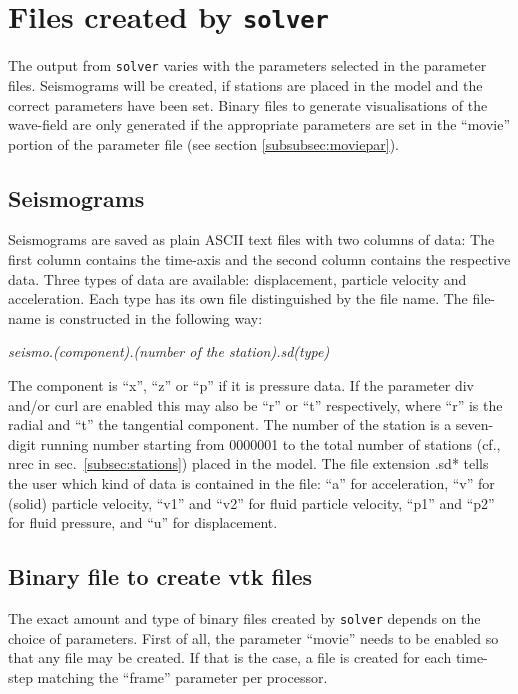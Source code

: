 	\section{Files created by \texttt{solver}}
	\label{sec:solver}
		The output from \texttt{solver} varies with the parameters selected in the parameter files. Seismograms will be created, if stations are placed in the model and the correct parameters have been set. Binary files to generate visualisations of the wave-field are only generated if the appropriate parameters are set in the ``movie'' portion of the parameter file (see section \ref{subsubsec:moviepar}).
		
		\subsection{Seismograms}
			Seismograms are saved as plain ASCII text files with two columns of data: The first column contains the time-axis and the second column contains the respective data. Three types of data are available: displacement, particle velocity and acceleration. Each type has its own file distinguished by the file name. The file-name is constructed in the following way:
			\begin{center}%
				\emph{seismo.(component).(number of the station).sd(type)}
			\end{center}
			The component is ``x'', ``z'' or ``p'' if it is pressure data. If the parameter div and/or curl are enabled this may also be ``r'' or ``t'' respectively, where ``r'' is the radial and ``t'' the tangential component. The number of the station is a seven-digit running number starting from 0000001 to the total number of stations (cf., nrec in sec.~\ref{subsec:stations}) placed in the model. The file extension .sd* tells the user which kind of data is contained in the file: ``a'' for acceleration, ``v'' for (solid) particle velocity, ``v1'' and ``v2'' for fluid particle velocity, ``p1'' and ``p2'' for fluid pressure, and ``u'' for displacement.
			
			\medskip
			
		\subsection{Binary file to create vtk files}
		\label{subsec:binvtk}
			The exact amount and type of binary files created by \texttt{solver} depends on the choice of parameters. First of all, the parameter ``movie'' needs to be enabled so that any file may be created. If that is the case, a file is created for each time-step matching the ``frame'' parameter per processor.
			
